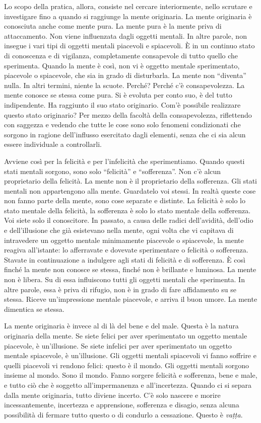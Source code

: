 Lo scopo della pratica, allora, consiste nel cercare interiormente,
nello scrutare e investigare fino a quando si raggiunge la mente
originaria. La mente originaria è conosciuta anche come mente pura. La
mente pura è la mente priva di attaccamento. Non viene influenzata dagli
oggetti mentali. In altre parole, non insegue i vari tipi di oggetti
mentali piacevoli e spiacevoli. È in un continuo stato di conoscenza e
di vigilanza, completamente consapevole di tutto quello che sperimenta.
Quando la mente è così, non vi è oggetto mentale sperimentato, piacevole
o spiacevole, che sia in grado di disturbarla. La mente non ``diventa''
nulla. In altri termini, niente la scuote. Perché? Perché c'è
consapevolezza. La mente conosce se stessa come pura. Si è evoluta per
conto suo, è del tutto indipendente. Ha raggiunto il suo stato
originario. Com'è possibile realizzare questo stato originario? Per
mezzo della facoltà della consapevolezza, riflettendo con saggezza e
vedendo che tutte le cose sono solo fenomeni condizionati che sorgono in
ragione dell'influsso esercitato dagli elementi, senza che ci sia alcun
essere individuale a controllarli.

Avviene così per la felicità e per l'infelicità che sperimentiamo.
Quando questi stati mentali sorgono, sono solo ``felicità'' e
``sofferenza''. Non c'è alcun proprietario della felicità. La mente non
è il proprietario della sofferenza. Gli stati mentali non appartengono
alla mente. Guardatelo voi stessi. In realtà queste cose non fanno parte
della mente, sono cose separate e distinte. La felicità è solo lo stato
mentale della felicità, la sofferenza è solo lo stato mentale della
sofferenza. Voi siete solo il conoscitore. In passato, a causa delle
radici dell'avidità, dell'odio e dell'illusione che già esistevano nella
mente, ogni volta che vi capitava di intravedere un oggetto mentale
minimamente piacevole o spiacevole, la mente reagiva all'istante: lo
afferravate e dovevate sperimentare o felicità o sofferenza. Stavate in
continuazione a indulgere agli stati di felicità e di sofferenza. È così
finché la mente non conosce se stessa, finché non è brillante e
luminosa. La mente non è libera. Su di essa influiscono tutti gli
oggetti mentali che sperimenta. In altre parole, essa è priva di
rifugio, non è in grado di fare affidamento su se stessa. Riceve
un'impressione mentale piacevole, e arriva il buon umore. La mente
dimentica se stessa.

La mente originaria è invece al di là del bene e del male. Questa è la
natura originaria della mente. Se siete felici per aver sperimentato un
oggetto mentale piacevole, è un'illusione. Se siete infelici per aver
sperimentato un oggetto mentale spiacevole, è un'illusione. Gli oggetti
mentali spiacevoli vi fanno soffrire e quelli piacevoli vi rendono
felici: questo è il mondo. Gli oggetti mentali sorgono insieme al mondo.
Sono il mondo. Fanno sorgere felicità e sofferenza, bene e male, e tutto
ciò che è soggetto all'impermanenza e all'incertezza. Quando ci si
separa dalla mente originaria, tutto diviene incerto. C'è solo nascere e
morire incessantemente, incertezza e apprensione, sofferenza e disagio,
senza alcuna possibilità di fermare tutto questo o di condurlo a
cessazione. Questo è \emph{vaṭṭa}.

